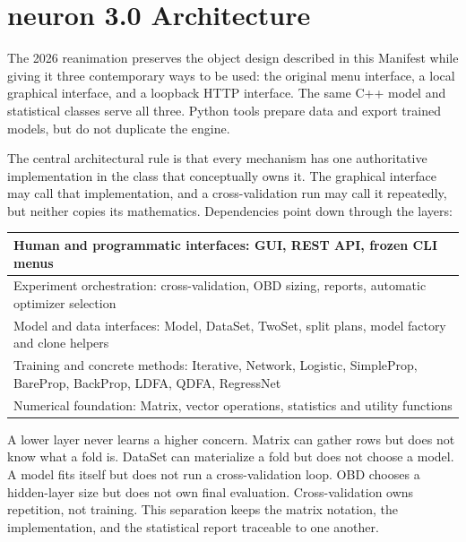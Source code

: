 \chapter{neuron 3.0 Architecture}\label{modern_architecture}

The 2026 reanimation preserves the object design described in this
Manifest while giving it three contemporary ways to be used: the
original menu interface, a local graphical interface, and a loopback
HTTP interface.  The same C++ model and statistical classes serve all
three.  Python tools prepare data and export trained models, but do not
duplicate the engine.

The central architectural rule is that every mechanism has one
authoritative implementation in the class that conceptually owns it.
The graphical interface may call that implementation, and a
cross-validation run may call it repeatedly, but neither copies its
mathematics.  Dependencies point down through the layers:

\begin{center}
\begin{tabular}{|>{\raggedright\arraybackslash}p{4.35in}|}
\hline
Human and programmatic interfaces: GUI, REST API, frozen CLI menus \\
\hline
Experiment orchestration: cross-validation, OBD sizing, reports,
automatic optimizer selection \\
\hline
Model and data interfaces: Model, DataSet, TwoSet, split plans,
model factory and clone helpers \\
\hline
Training and concrete methods: Iterative, Network, Logistic,
SimpleProp, BareProp, BackProp, LDFA, QDFA, RegressNet \\
\hline
Numerical foundation: Matrix, vector operations, statistics and
utility functions \\
\hline
\end{tabular}
\end{center}

A lower layer never learns a higher concern.  Matrix can gather rows
but does not know what a fold is.  DataSet can materialize a fold but
does not choose a model.  A model fits itself but does not run a
cross-validation loop.  OBD chooses a hidden-layer size but does not
own final evaluation.  Cross-validation owns repetition, not training.
This separation keeps the matrix notation, the implementation, and the
statistical report traceable to one another.

